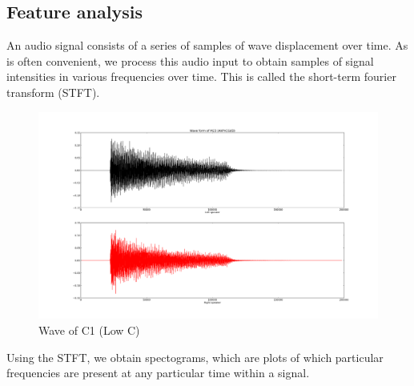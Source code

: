 \documentclass{article}
\begin{document}
\subsection{Feature analysis}
An audio signal consists of a series of samples of wave displacement over time.
As is often convenient, we process this audio input to obtain samples of
signal intensities in various frequencies over time. This is called the
short-term fourier transform (STFT).

\begin{figure}
\includegraphics[scale=.13]{wave_m23.png}
\caption{Wave of C1 (Low C)}
\end{figure}

Using the STFT, we obtain spectograms, which are plots of which
particular frequencies are present at any particular time within a signal.
\end{document}
